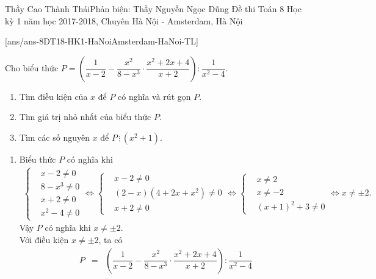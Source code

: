 
\begin{name}
{Thầy Cao Thành Thái\newline Phản biện: Thầy Nguyễn Ngọc Dũng}
{Đề thi Toán 8 Học kỳ 1 năm học 2017-2018, Chuyên Hà Nội - Amsterdam, Hà Nội}
\end{name}
\setcounter{bt}{0}
[ans/ans-8DT18-HK1-HaNoiAmsterdam-HaNoi-TL]

\begin{bt}%
 Cho biểu thức $P=\left(\dfrac{1}{x-2} - \dfrac{x^2}{8-x^3} \cdot \dfrac{x^2+2x+4}{x+2}\right) : \dfrac{1}{x^2-4}$.
 \begin{enumerate}
  \item Tìm điều kiện của $x$ để $P$ có nghĩa và rút gọn $P$.
  \item Tìm giá trị nhỏ nhất của biểu thức $P$.
  \item Tìm các số nguyên $x$ để $P \,\vdots\, (x^2+1)$.
 \end{enumerate}
 \loigiai
  {
  \begin{enumerate}
   \item Biểu thức $P$ có nghĩa khi
   \begin{eqnarray*}
    \left\{\begin{aligned}&x-2 \neq 0 \\&8-x^3 \neq 0 \\&x+2 \neq 0 \\&x^2-4\neq 0\end{aligned}\right. \Leftrightarrow \left\{\begin{aligned}&x-2 \neq 0 \\&(2-x)(4+2x+x^2) \neq 0 \\&x+2 \neq 0\end{aligned}\right. \Leftrightarrow \left\{\begin{aligned}&x \neq 2 \\&x \neq -2 \\&(x+1)^2+3 \neq 0\end{aligned}\right. \Leftrightarrow x \neq \pm 2.
   \end{eqnarray*}
   Vậy $P$ có nghĩa khi $x \neq \pm 2$.\\
   Với điều kiện $x \neq \pm 2$, ta có
   \allowdisplaybreaks
   \begin{eqnarray*}
    P &=& \left(\dfrac{1}{x-2} - \dfrac{x^2}{8-x^3} \cdot \dfrac{x^2+2x+4}{x+2}\right) : \dfrac{1}{x^2-4}\\

\end{eqnarray*}
\end{enumerate}}
\end{bt}
